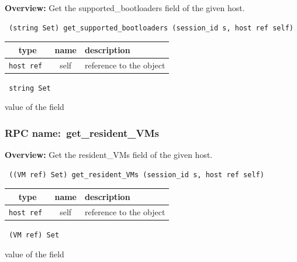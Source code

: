 {\bf Overview:} 
Get the supported\_bootloaders field of the given host.

\begin{verbatim} (string Set) get_supported_bootloaders (session_id s, host ref self)\end{verbatim}



 
\vspace{0.3cm}
\begin{tabular}{|c|c|p{7cm}|}
 \hline
{\bf type} & {\bf name} & {\bf description} \\ \hline
{\tt host ref } & self & reference to the object \\ \hline 

\end{tabular}

\vspace{0.3cm}

{\tt 
string Set
}


value of the field
\vspace{0.3cm}
\vspace{0.3cm}
\vspace{0.3cm}
\subsubsection{RPC name:~get\_resident\_VMs}

{\bf Overview:} 
Get the resident\_VMs field of the given host.

\begin{verbatim} ((VM ref) Set) get_resident_VMs (session_id s, host ref self)\end{verbatim}



 
\vspace{0.3cm}
\begin{tabular}{|c|c|p{7cm}|}
 \hline
{\bf type} & {\bf name} & {\bf description} \\ \hline
{\tt host ref } & self & reference to the object \\ \hline 

\end{tabular}

\vspace{0.3cm}

{\tt 
(VM ref) Set
}


value of the field
\vspace{0.3cm}
\vspace{0.3cm}
\vspace{0.3cm}

